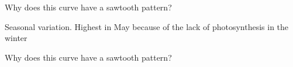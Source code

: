 \documentclass[addpoints]{exam}
\begin{document}
\begin{questions}
\question[1] Why does this curve have a sawtooth pattern?
\begin{solutionordottedlines}[3cm]
    Seasonal variation. Highest in May because of the lack of photosynthesis in the winter
\end{solutionordottedlines}

\question[1] Why does this curve have a sawtooth pattern?

\end{questions}
\end{document}
